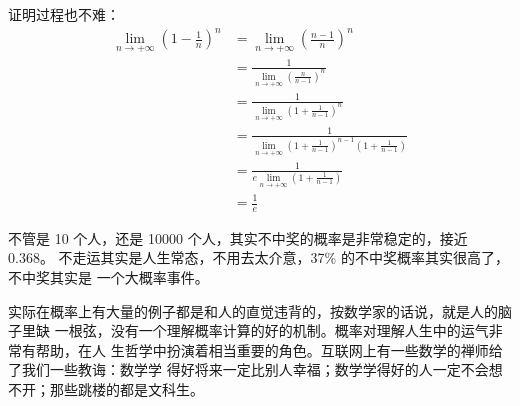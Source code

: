 证明过程也不难：
\begin{align*}
\lim_{n \rightarrow +\infty } (1 - \frac1n)^n & = \lim_{n \rightarrow +\infty } (\frac {n-1} {n})^n   \\
&=  \frac {1} {\displaystyle \lim_{n \rightarrow +\infty } (\frac {n} {n-1})^n} \\
&=  \frac {1} {\displaystyle \lim_{n \rightarrow +\infty } ( 1 + \frac {1}{n-1})^n}  \\
&=  \frac {1} {\displaystyle \lim_{n \rightarrow +\infty } ( 1 + \frac {1}{n-1})^{n-1} (1+\frac {1} {n-1})} \\
&=  \frac {1} {e \displaystyle \lim_{n \rightarrow +\infty } (1+\frac {1} {n-1})} \\
&= \frac1e
\end{align*}

不管是 10 个人，还是 10000 个人，其实不中奖的概率是非常稳定的，接近 0.368。
不走运其实是人生常态，不用去太介意，37\% 的不中奖概率其实很高了，不中奖其实是
一个大概率事件。

实际在概率上有大量的例子都是和人的直觉违背的，按数学家的话说，就是人的脑子里缺
一根弦，没有一个理解概率计算的好的机制。概率对理解人生中的运气非常有帮助，在人
生哲学中扮演着相当重要的角色。互联网上有一些数学的禅师给了我们一些教诲：数学学
得好将来一定比别人幸福；数学学得好的人一定不会想不开；那些跳楼的都是文科生。
